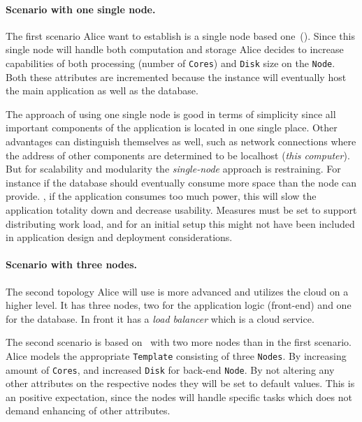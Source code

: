 \paragraph{Scenario with one single node.}

The first scenario Alice want to establish is a single node based one~().
Since this single node will handle both computation and storage Alice decides to 
increase capabilities of both processing (number of \texttt{Cores}) and 
\texttt{Disk} size on the \texttt{Node}.
Both these attributes are incremented because the instance will eventually host the main
application as well as the database.

The approach of using one single node is good in terms of simplicity since all important
components of the application is located in one single place.
Other advantages can distinguish themselves as well, such as network connections where
the address of other components are determined to be localhost (\emph{this computer}).
But for scalability and modularity the \emph{single-node} approach is restraining.
For instance if the database should eventually consume more space than the node can provide.
\eg, if the application consumes too much  power, 
this will slow the application totality down and decrease usability.
Measures must be set to support distributing work load, and for an initial setup this might not have been
included in application design and deployment considerations.

\paragraph{Scenario with three nodes.}

\hr
The second topology Alice will use is more advanced and utilizes the cloud on a higher level.
It has three nodes, two for the application logic (front-end) and one for the database.
In front it has a \emph{load balancer} which is a cloud service.
\hr

The second scenario is based on~ with two more nodes than in the first scenario.
Alice models the appropriate \texttt{Template} consisting
of three \texttt{Nodes}.
By increasing amount of \texttt{Cores}, and increased \texttt{Disk} for back-end \texttt{Node}.
By not altering any other attributes on the respective nodes they will be set to default values.
This is an positive expectation, since the nodes will handle specific tasks which does not 
demand enhancing of other attributes.

